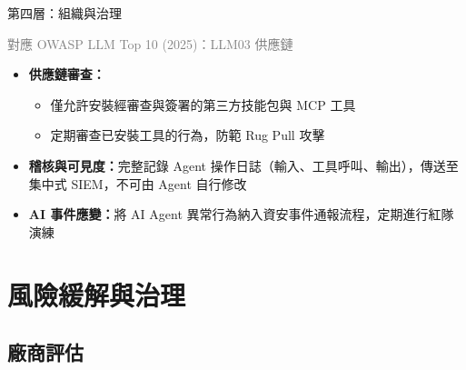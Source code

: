 \documentclass[aspectratio=1610]{Common/MyCourseBeamer}
\begin{document}
\begin{frame}{第四層：組織與治理}

	{\scriptsize\textcolor{gray}{對應 OWASP LLM Top 10 (2025)：LLM03 供應鏈}}\vspace{0.3em}

	\begin{itemize}
		\item \textbf{供應鏈審查：}
			\begin{itemize}
				\item 僅允許安裝經審查與簽署的第三方技能包與 MCP 工具
				\item 定期審查已安裝工具的行為，防範 Rug Pull 攻擊
			\end{itemize}
		\item \textbf{稽核與可見度：}完整記錄 Agent 操作日誌（輸入、工具呼叫、輸出），傳送至集中式 SIEM，不可由 Agent 自行修改
		\item \textbf{AI 事件應變：}將 AI Agent 異常行為納入資安事件通報流程，定期進行紅隊演練
	\end{itemize}

\end{frame}


\section{風險緩解與治理}

\subsection{廠商評估}
\end{document}
